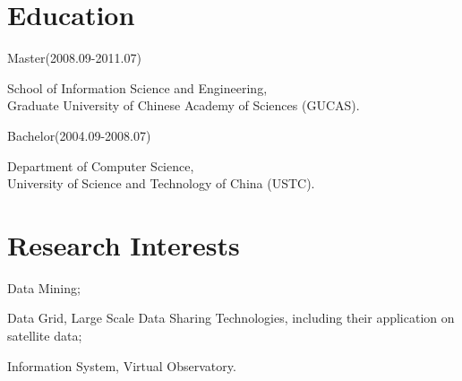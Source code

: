 \documentclass[10pt,letterpaper]{article}
\renewenvironment{itemize}{
  \begin{list}{}{
    \setlength{\leftmargin}{1.5em}
    \setlength{\itemsep}{0.25em}
    \setlength{\parskip}{0pt}
    \setlength{\parsep}{0.25em}
  }
}{
  \end{list}
}
\begin{document}
\section*{Education}
\begin{itemize}
  \item Master(2008.09-2011.07)
    \begin{itemize}
    \item 
      School of Information Science and Engineering,\\
      Graduate University of Chinese Academy of Sciences (GUCAS).
    \end{itemize}

  \item Bachelor(2004.09-2008.07)
    \begin{itemize}
    \item
      Department of Computer Science,\\
      University of Science and Technology of China (USTC).
    \end{itemize}
\end{itemize}


\section*{Research Interests}
\begin{itemize}
  \item Data Mining;
  \item Data Grid, Large Scale Data Sharing Technologies, including their application on satellite data;
  \item Information System, Virtual Observatory.
\end{itemize}
\end{document}
